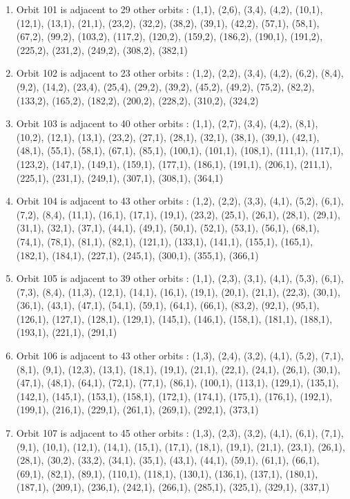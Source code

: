 \documentclass[12pt]{article}
\begin{document}
\begin{enumerate}
\item Orbit 101 is adjacent to 29 other orbits : (1,1), (2,6), (3,4), (4,2), (10,1), (12,1), (13,1), (21,1), (23,2), (32,2), (38,2), (39,1), (42,2), (57,1), (58,1), (67,2), (99,2), (103,2), (117,2), (120,2), (159,2), (186,2), (190,1), (191,2), (225,2), (231,2), (249,2), (308,2), (382,1)
\item Orbit 102 is adjacent to 23 other orbits : (1,2), (2,2), (3,4), (4,2), (6,2), (8,4), (9,2), (14,2), (23,4), (25,4), (29,2), (39,2), (45,2), (49,2), (75,2), (82,2), (133,2), (165,2), (182,2), (200,2), (228,2), (310,2), (324,2)
\item Orbit 103 is adjacent to 40 other orbits : (1,1), (2,7), (3,4), (4,2), (8,1), (10,2), (12,1), (13,1), (23,2), (27,1), (28,1), (32,1), (38,1), (39,1), (42,1), (48,1), (55,1), (58,1), (67,1), (85,1), (100,1), (101,1), (108,1), (111,1), (117,1), (123,2), (147,1), (149,1), (159,1), (177,1), (186,1), (191,1), (206,1), (211,1), (225,1), (231,1), (249,1), (307,1), (308,1), (364,1)
\item Orbit 104 is adjacent to 43 other orbits : (1,2), (2,2), (3,3), (4,1), (5,2), (6,1), (7,2), (8,4), (11,1), (16,1), (17,1), (19,1), (23,2), (25,1), (26,1), (28,1), (29,1), (31,1), (32,1), (37,1), (44,1), (49,1), (50,1), (52,1), (53,1), (56,1), (68,1), (74,1), (78,1), (81,1), (82,1), (121,1), (133,1), (141,1), (155,1), (165,1), (182,1), (184,1), (227,1), (245,1), (300,1), (355,1), (366,1)
\item Orbit 105 is adjacent to 39 other orbits : (1,1), (2,3), (3,1), (4,1), (5,3), (6,1), (7,3), (8,4), (11,3), (12,1), (14,1), (16,1), (19,1), (20,1), (21,1), (22,3), (30,1), (36,1), (43,1), (47,1), (54,1), (59,1), (64,1), (66,1), (83,2), (92,1), (95,1), (126,1), (127,1), (128,1), (129,1), (145,1), (146,1), (158,1), (181,1), (188,1), (193,1), (221,1), (291,1)
\item Orbit 106 is adjacent to 43 other orbits : (1,3), (2,4), (3,2), (4,1), (5,2), (7,1), (8,1), (9,1), (12,3), (13,1), (18,1), (19,1), (21,1), (22,1), (24,1), (26,1), (30,1), (47,1), (48,1), (64,1), (72,1), (77,1), (86,1), (100,1), (113,1), (129,1), (135,1), (142,1), (145,1), (153,1), (158,1), (172,1), (174,1), (175,1), (176,1), (192,1), (199,1), (216,1), (229,1), (261,1), (269,1), (292,1), (373,1)
\item Orbit 107 is adjacent to 45 other orbits : (1,3), (2,3), (3,2), (4,1), (6,1), (7,1), (9,1), (10,1), (12,1), (14,1), (15,1), (17,1), (18,1), (19,1), (21,1), (23,1), (26,1), (28,1), (30,2), (33,2), (34,1), (35,1), (43,1), (44,1), (59,1), (61,1), (66,1), (69,1), (82,1), (89,1), (110,1), (118,1), (130,1), (136,1), (137,1), (180,1), (187,1), (209,1), (236,1), (242,1), (266,1), (285,1), (325,1), (329,1), (337,1)

\end{enumerate}
\end{document}

